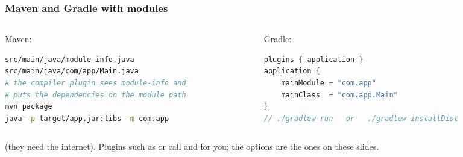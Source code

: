 \documentclass[aspectratio=169,10pt,compress]{beamer}
\begin{document}
\begin{frame}[t,fragile] \frametitle{Maven and Gradle with modules}
  \begin{columns}[T]
    \begin{column}{0.48\textwidth}
      \begin{block}{Maven: }


\begin{lstlisting}[style=codesnippet, language=bash, basicstyle=\ttfamily\tiny]
src/main/java/module-info.java
src/main/java/com/app/Main.java
# the compiler plugin sees module-info and
# puts the dependencies on the module path
mvn package
java -p target/app.jar:libs -m com.app
\end{lstlisting}


      \end{block}
    \end{column}
    \begin{column}{0.48\textwidth}
      \begin{block}{Gradle: }


\begin{lstlisting}[style=codesnippet, language=Java, basicstyle=\ttfamily\tiny]
plugins { application }
application {
    mainModule = "com.app"
    mainClass  = "com.app.Main"
}
// ./gradlew run   or   ./gradlew installDist
\end{lstlisting}


      \end{block}
    \end{column}
  \end{columns}
  \small {} (they need the internet). Plugins such as  or
   call  and  for you; the options are the ones on these slides.
\end{frame}

\end{document}

